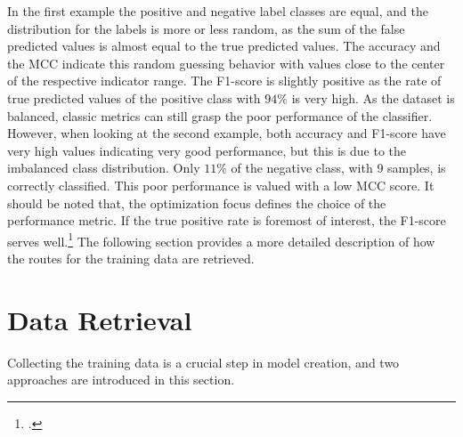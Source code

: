 In the first example the positive and negative label classes are equal, and the distribution for the
labels is more or less random, as the sum of the false predicted values is almost equal to
the true predicted values. The accuracy and the \gls{MCC} indicate this random guessing
behavior with values close to the center of the respective indicator range.
The F1-score is slightly positive as the rate of true predicted values of the positive class
with $94\%$ is very high. As the dataset is balanced, classic metrics can still grasp
the poor performance of the classifier. However, when looking at the second example, both
accuracy and F1-score have very high values indicating very good performance, but this is
due to the imbalanced class distribution. Only $11\%$ of the negative class, with 9 samples,
is correctly classified. This poor performance is valued with a low \gls{MCC} score.
It should be noted that, the optimization focus defines the choice of the performance metric.
If the true positive rate is foremost of interest, the F1-score serves well.\footcite[cf.][p. 8f]{chicco_advantages_2020}
The following section provides a more detailed description of how the routes for the training data are retrieved.

\section{Data Retrieval}
\label{sec:DataRetrieval}

Collecting the training data is a crucial step in model creation, and two approaches are introduced in this section.

